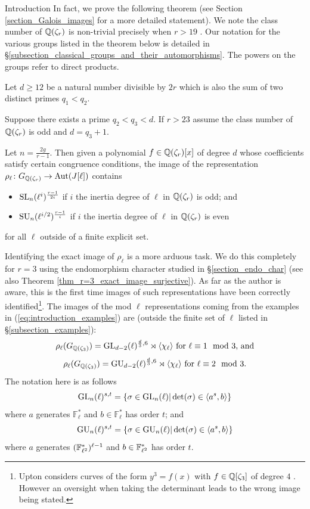 \documentclass[11pt,a4paper]{article}
\newcommand{\Fl}{\mathbb{F}_\ell}
\newcommand{\Qr}{{\QQ(\zeta_r)}}
\newcommand{\Gcyclo}[1]{G_{\QQ(\zeta_{#1})}}
\newcommand{\GQr}{G_{\QQ(\zeta_{r})}}
\begin{document}
\begin{section}{Introduction}
In fact, we prove the following theorem (see Section \ref{section_Galois_images} for a more detailed statement). We note the class number of $\Qr$ is non-trivial precisely when $r>19$ \cite{Masley_Montgomery_cyclotomic_fields_UFD}.
Our notation for the various groups listed in the theorem below is detailed in \S \ref{subsection_classical_groups_and_their_automorphisms}.
The powers on the groups refer to direct products.
\begin{theorem}
 Let $d \geq 12$ be a natural number divisible by $2r$ which is also the sum of two distinct primes $q_1<q_2$.

 Suppose there exists a prime $q_2<q_3<d$. If $r>23$ assume the class number of $\Qr$ is odd and $d=q_3+1$.

Let $n = \frac{2g}{r-1}$. Then given a polynomial $f \in \Qr[x]$ of degree $d$ whose coefficients satisfy certain congruence conditions, the image of the representation $\rho_\ell\colon\GQr \rightarrow \Aut(J[\ell])$ contains
\begin{itemize}
    \item $\SL_n(\ell^i)^{\frac{r-1}{2i}}$ if $i$ the inertia degree of $\ell$ in $\Qr$ is odd; and
    \item $\SU_n(\ell^{i/2})^{\frac{r-1}{i}}$ if $i$ the inertia degree of $\ell$ in $\Qr$ is even
\end{itemize}
for all $\ell$ outside of a finite explicit set. 
\end{theorem}


Identifying the exact image of $\rho_\ell$ is a more arduous task. We do this completely for $r=3$ using the endomorphism character studied in \S \ref{section_endo_char} (see also Theorem \ref{thm_r=3_exact_image_surjective}).
As far as the author is aware, this is the first time images of such representations have been correctly identified\footnote{Upton considers curves of the form $y^3=f(x)$ with $f \in \mathbb{Q}[\zeta_3]$ of degree $4$ \cite{Upton}. However an oversight when taking the determinant leads to the wrong image being stated.}. 
The images of the mod $\ell$ representations coming from the examples in (\ref{eq:introduction_examples})  are (outside the finite set of $\ell$ listed in \S \ref{subsection_examples}):
\[\rho_\ell(\Gcyclo{3}) = \GL_{d-2}(\ell)^{\frac{d}{3},6} \rtimes \langle \chi_\ell \rangle \text{ for $\ell \equiv 1 \mod{3}$, and}
\]
\[\rho_\ell(\Gcyclo{3}) = \GU_{d-2}(\ell)^{\frac{d}{3},6} \rtimes \langle \chi_\ell \rangle \text{ for $\ell \equiv 2 \mod{3}$.}
\]
The notation here is as follows
\[\GL_n(\ell)^{s, t} = \{\sigma \in \GL_n(\ell)| \det(\sigma) \in \langle a^s,b\rangle \}\] where $a$ generates $\Fl^*$ and $b \in \Fl^*$ has order $t$; and
\[\GU_n(\ell)^{s,t} =
\{ \sigma \in \GU_n(\ell)| \det(\sigma) \in \langle a^s,b\rangle \}\] where $a$ generates $(\mathbb{F}_{\ell^2}^*)^{\ell-1}$ and $b \in \mathbb{F}_{\ell^2}^*$ has order $t$.


\end{section}
\end{document}
